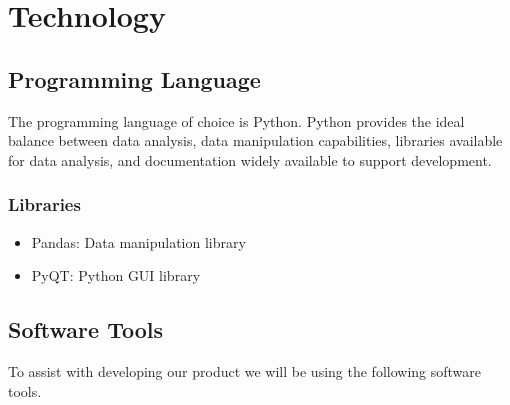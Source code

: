 \documentclass{article}
\begin{document}
\section{Technology}

\subsection{Programming Language}

The programming language of choice is Python. Python provides the ideal balance between data analysis, data manipulation capabilities, libraries available for data analysis, and documentation widely available to support development.  

\subsubsection{Libraries}
\begin{itemize}
	\item Pandas: Data manipulation library
	\item PyQT: Python GUI library
\end{itemize}


\subsection{Software Tools}
To assist with developing our product we will be using the following software tools.
\end{document}
